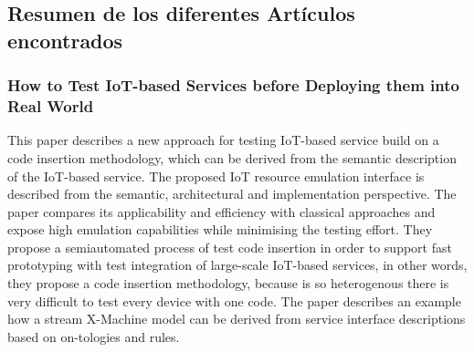 
\subsection{Resumen de los diferentes Artículos encontrados}

\subsubsection{How to Test IoT-based Services before Deploying them into Real World}\cite{Paper2}
This paper describes  a  new  approach  for  testing  IoT-based  service  build on  a  code  insertion  methodology,  which  can  be  derived  from the semantic description of the IoT-based service.
The proposed IoT resource emulation interface is described from the semantic, architectural  and  implementation  perspective.  The  paper  compares its applicability and efficiency with classical approaches and expose  high  emulation  capabilities  while  minimising  the  testing effort.
They propose a semiautomated process of test code insertion in order to support fast prototyping with test integration of large-scale IoT-based services, in other words, they propose a code insertion methodology, because \IoT is so heterogenous there is very difficult to test every device with one code.
The paper describes an example how a stream X-Machine model can be derived from service interface descriptions based on on-tologies and rules.


